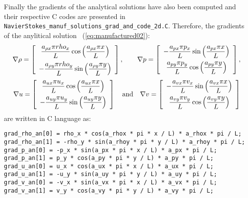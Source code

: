 \documentclass[10pt]{article}
\begin{document}
\begin{landscape}
Finally the gradients of the analytical solutions have also been computed and their respective C codes are presented in \\ \texttt{NavierStokes\_manuf\_solutions\_grad\_and\_code\_2d.C}. Therefore, the gradients of the anylitical solution~ (\ref{eq:manufactured02}):
\begin{equation}
\nabla \rho = \left[ \begin{array}{c}
 \dfrac{  a_{\rho x}  \pi rho_x }{L} \cos\left( \dfrac{ a_{\rho x}  \pi  x }{L}\right) \vspace{5pt}\\ 
 -\dfrac{  a_{\rho y}  \pi rho_y }{L} \sin\left( \dfrac{ a_{\rho y}  \pi  y }{L}\right) 
\end{array} \right],
\qquad
\nabla p = \left[ \begin{array}{c}
- \dfrac{  a_{px}  \pi p_x }{L} \sin\left( \dfrac{ a_{px}  \pi  x }{L}\right) \vspace{5pt}\\
  \dfrac{  a_{py}  \pi p_y }{L} \cos\left( \dfrac{ a_{py}  \pi  y }{L}\right)
\end{array} \right],
\end{equation}
\begin{equation}
\nabla u = \left[ \begin{array}{c}
\dfrac{  a_{ux}  \pi u_x}{L} \cos\left( \dfrac{ a_{ux}  \pi  x }{L}\right)\vspace{5pt} \\
-  \dfrac{  a_{uy}  \pi u_y }{L} \sin\left( \dfrac{ a_{uy}  \pi  y }{L}\right)
\end{array} \right]
\quad \mbox{and} \quad
\nabla v = \left[ \begin{array}{c}
-  \dfrac{  a_{vx}  \pi v_x }{L} \sin\left( \dfrac{ a_{vx}  \pi  x }{L}\right)\vspace{5pt} \\
 \dfrac{  a_{vy}  \pi  v_y }{L} \cos\left( \dfrac{ a_{vy}  \pi  y }{L}\right) 
\end{array} \right]
\end{equation}
are written in C language as:

\begin{verbatim}
grad_rho_an[0] = rho_x * cos(a_rhox * pi * x / L) * a_rhox * pi / L;
grad_rho_an[1] = -rho_y * sin(a_rhoy * pi * y / L) * a_rhoy * pi / L;
grad_p_an[0] = -p_x * sin(a_px * pi * x / L) * a_px * pi / L;
grad_p_an[1] = p_y * cos(a_py * pi * y / L) * a_py * pi / L;
grad_u_an[0] = u_x * cos(a_ux * pi * x / L) * a_ux * pi / L;
grad_u_an[1] = -u_y * sin(a_uy * pi * y / L) * a_uy * pi / L;
grad_v_an[0] = -v_x * sin(a_vx * pi * x / L) * a_vx * pi / L;
grad_v_an[1] = v_y * cos(a_vy * pi * y / L) * a_vy * pi / L;
\end{verbatim}




 

\end{landscape}
\end{document}
